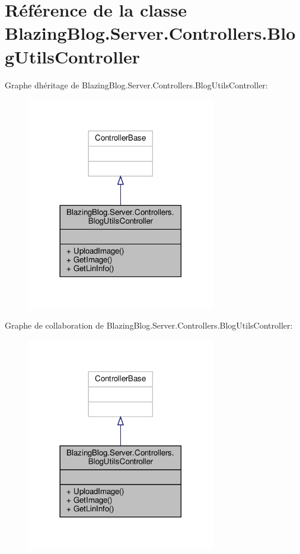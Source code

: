 \hypertarget{class_blazing_blog_1_1_server_1_1_controllers_1_1_blog_utils_controller}{}\section{Référence de la classe Blazing\+Blog.\+Server.\+Controllers.\+Blog\+Utils\+Controller}
\label{class_blazing_blog_1_1_server_1_1_controllers_1_1_blog_utils_controller}


Graphe d\textquotesingle{}héritage de Blazing\+Blog.\+Server.\+Controllers.\+Blog\+Utils\+Controller\+:
\nopagebreak
\begin{figure}[H]
\begin{center}
\leavevmode
\includegraphics[width=233pt]{class_blazing_blog_1_1_server_1_1_controllers_1_1_blog_utils_controller__inherit__graph}
\end{center}
\end{figure}


Graphe de collaboration de Blazing\+Blog.\+Server.\+Controllers.\+Blog\+Utils\+Controller\+:
\nopagebreak
\begin{figure}[H]
\begin{center}
\leavevmode
\includegraphics[width=233pt]{class_blazing_blog_1_1_server_1_1_controllers_1_1_blog_utils_controller__coll__graph}
\end{center}
\end{figure}
